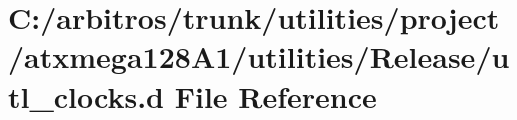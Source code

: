 \hypertarget{utilities_2project_2atxmega128_a1_2utilities_2_release_2utl__clocks_8d}{\section{C\-:/arbitros/trunk/utilities/project/atxmega128\-A1/utilities/\-Release/utl\-\_\-clocks.d File Reference}
\label{utilities_2project_2atxmega128_a1_2utilities_2_release_2utl__clocks_8d}
}
